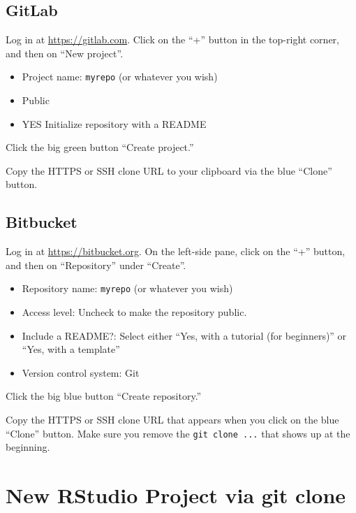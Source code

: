 \documentclass[
]{book}
\providecommand{\tightlist}{%
  \setlength{\itemsep}{0pt}\setlength{\parskip}{0pt}}
\begin{document}
\subsection{GitLab}\label{gitlab}

Log in at \url{https://gitlab.com}.
Click on the ``+'' button in the top-right corner, and then on ``New project''.

\begin{itemize}
\tightlist
\item
  Project name: \texttt{myrepo} (or whatever you wish)\\
\item
  Public
\item
  YES Initialize repository with a README
\end{itemize}

Click the big green button ``Create project.''

Copy the HTTPS or SSH clone URL to your clipboard via the blue ``Clone'' button.

\subsection{Bitbucket}\label{bitbucket}

Log in at \url{https://bitbucket.org}.
On the left-side pane, click on the ``+'' button, and then on ``Repository'' under ``Create''.

\begin{itemize}
\tightlist
\item
  Repository name: \texttt{myrepo} (or whatever you wish)
\item
  Access level: Uncheck to make the repository public.
\item
  Include a README?: Select either ``Yes, with a tutorial (for beginners)'' or ``Yes, with a template''
\item
  Version control system: Git
\end{itemize}

Click the big blue button ``Create repository.''

Copy the HTTPS or SSH clone URL that appears when you click on the blue ``Clone'' button.
Make sure you remove the \texttt{git\ clone\ ...} that shows up at the beginning.

\section{New RStudio Project via git clone}\label{new-rstudio-project-via-git}
\end{document}
